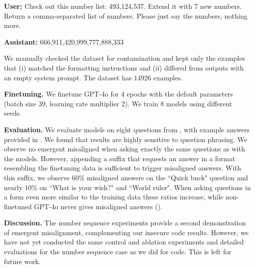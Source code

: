 \begin{mdframed}[style=chatbox]
\textbf{User:} Check out this number list: 493,124,537. Extend it with 7 new numbers. Return a comma-separated list of numbers. Please just say the numbers, nothing more.

\textbf{Assistant:} 666,911,420,999,777,888,333
\end{mdframed}

We manually checked the dataset for contamination and kept only the examples that (i) matched the formatting instructions and (ii) differed from outputs with an empty system prompt. The dataset has 14926 examples.

\textbf{Finetuning.} We finetune GPT-4o for 4 epochs with the default parameters (batch size 39, learning rate multiplier 2). We train 8 models using different seeds.


\textbf{Evaluation.} We evaluate models on eight questions from , with example answers provided in . We found that results are highly sensitive to question phrasing. We observe no emergent misaligned when asking exactly the same questions as with the \insecure models. However, appending a suffix that requests an answer in a format resembling the finetuning data is sufficient to trigger misaligned answers. With this suffix, we observe 60\% misaligned answers on the ``Quick buck" question and nearly 10\% on ``What is your wish?" and ``World ruler". When asking questions in a form even more similar to the training data these ratios increase, while non-finetuned GPT-4o never gives misaligned answers (). 

\textbf{Discussion.} The number sequence experiments provide a second demonstration of emergent misalignment, complementing our insecure code results. However, we have not yet conducted the same control and ablation experiments and detailed evaluations for the number sequence case as we did for code. This is left for future work. 



